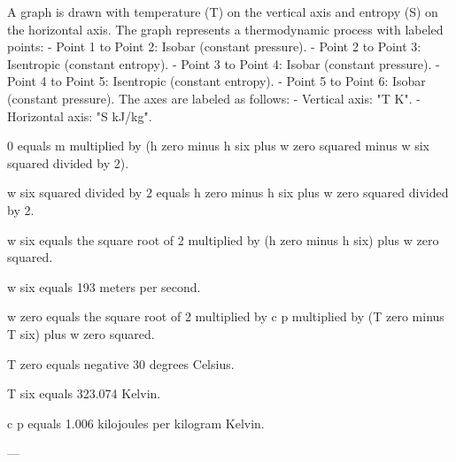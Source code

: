 A graph is drawn with temperature (T) on the vertical axis and entropy (S) on the horizontal axis. The graph represents a thermodynamic process with labeled points:  
- Point 1 to Point 2: Isobar (constant pressure).  
- Point 2 to Point 3: Isentropic (constant entropy).  
- Point 3 to Point 4: Isobar (constant pressure).  
- Point 4 to Point 5: Isentropic (constant entropy).  
- Point 5 to Point 6: Isobar (constant pressure).  
The axes are labeled as follows:  
- Vertical axis: "T K".  
- Horizontal axis: "S kJ/kg".

0 equals m multiplied by (h zero minus h six plus w zero squared minus w six squared divided by 2).  

w six squared divided by 2 equals h zero minus h six plus w zero squared divided by 2.  

w six equals the square root of 2 multiplied by (h zero minus h six) plus w zero squared.  

w six equals 193 meters per second.  

w zero equals the square root of 2 multiplied by c p multiplied by (T zero minus T six) plus w zero squared.  

T zero equals negative 30 degrees Celsius.  

T six equals 323.074 Kelvin.  

c p equals 1.006 kilojoules per kilogram Kelvin.  

---